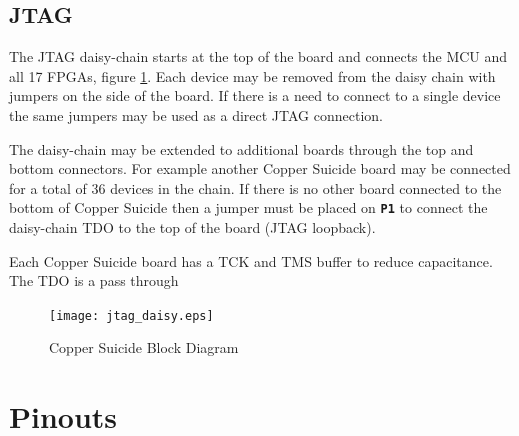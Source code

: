 \documentclass{article}
\newcommand{\designator}[1]{\textbf{\texttt{#1}}}
\begin{document}
\newpage

\subsection{JTAG}

The JTAG daisy-chain starts at the top of the board and connects the MCU and all 17 FPGAs, figure \ref{fig:jtagdaisy}. Each device may be removed from the daisy chain with jumpers on the side of the board. If there is a need to connect to a single device the same jumpers may be used as a direct JTAG connection.

The daisy-chain may be extended to additional boards through the top and bottom connectors. For example another Copper Suicide board may be connected for a total of 36 devices in the chain. If there is no other board connected to the bottom of Copper Suicide then a jumper must be placed on \designator{P1} to connect the daisy-chain TDO to the top of the board (JTAG loopback).

Each Copper Suicide board has a TCK and TMS buffer to reduce capacitance. The TDO is a pass through 

\begin{figure}[H]
  \centering
  \texttt{[image: jtag\_daisy.eps]}
  \caption{Copper Suicide Block Diagram}
  \label{fig:jtagdaisy}
\end{figure}

\section{Pinouts}
\end{document}
